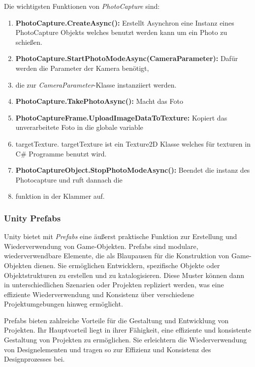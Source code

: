 Die wichtigsten Funktionen von \textit{PhotoCapture} sind:


\begin{enumerate}
    \item \textbf{PhotoCapture.CreateAsync():} Erstellt Asynchron eine Instanz eines PhotoCapture Objekts welches
    benutzt werden kann um ein Photo zu schießen.
    \item \textbf{PhotoCapture.StartPhotoModeAsync(CameraParameter):} Dafür werden die Parameter der Kamera benötigt,
    \item die zur \textit{CameraParameter}-Klasse instanziiert werden.
    \item \textbf{PhotoCapture.TakePhotoAsync():} Macht das Foto
    \item \textbf{PhotoCaptureFrame.UploadImageDataToTexture:} Kopiert das unverarbeitete Foto in die globale variable
    \item targetTexture. targetTexture ist ein Texture2D Klasse welches für texturen in C\# Programme benutzt wird.
    \item \textbf{PhotoCaptureObject.StopPhotoModeAsync():} Beendet die instanz des Photocapture und ruft dannach die
    \item funktion in der Klammer auf.
\end{enumerate}

\subsubsection{Unity Prefabs} 

Unity bietet mit \textit{Prefabs} eine äußerst praktische Funktion zur Erstellung und Wiederverwendung von Game-Objekten. Prefabs sind modulare, wiederverwendbare Elemente, die als Blaupausen für die Konstruktion von Game-Objekten dienen. Sie ermöglichen Entwicklern, spezifische Objekte oder Objektstrukturen zu erstellen und zu katalogisieren. Diese Muster können dann in unterschiedlichen Szenarien oder Projekten repliziert werden, was eine effiziente Wiederverwendung und Konsistenz über verschiedene Projektumgebungen hinweg ermöglicht.

Prefabs bieten zahlreiche Vorteile für die Gestaltung und Entwicklung von Projekten. Ihr Hauptvorteil liegt in ihrer Fähigkeit, eine effiziente und konsistente Gestaltung von Projekten zu ermöglichen. Sie erleichtern die Wiederverwendung von Designelementen und tragen so zur Effizienz und Konsistenz des Designprozesses bei.

